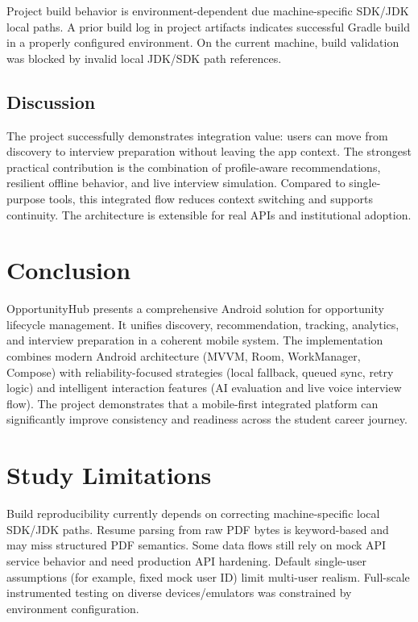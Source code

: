 \documentclass[conference]{IEEEtran}
\begin{document}
Project build behavior is environment-dependent due machine-specific SDK/JDK local paths. A prior build log in project artifacts indicates successful Gradle build in a properly configured environment. On the current machine, build validation was blocked by invalid local JDK/SDK path references.

\subsection{Discussion}

The project successfully demonstrates integration value: users can move from discovery to interview preparation without leaving the app context. The strongest practical contribution is the combination of profile-aware recommendations, resilient offline behavior, and live interview simulation. Compared to single-purpose tools, this integrated flow reduces context switching and supports continuity. The architecture is extensible for real APIs and institutional adoption.

\section{Conclusion}

OpportunityHub presents a comprehensive Android solution for opportunity lifecycle management. It unifies discovery, recommendation, tracking, analytics, and interview preparation in a coherent mobile system. The implementation combines modern Android architecture (MVVM, Room, WorkManager, Compose) with reliability-focused strategies (local fallback, queued sync, retry logic) and intelligent interaction features (AI evaluation and live voice interview flow). The project demonstrates that a mobile-first integrated platform can significantly improve consistency and readiness across the student career journey.

\section{Study Limitations}

Build reproducibility currently depends on correcting machine-specific local SDK/JDK paths. Resume parsing from raw PDF bytes is keyword-based and may miss structured PDF semantics. Some data flows still rely on mock API service behavior and need production API hardening. Default single-user assumptions (for example, fixed mock user ID) limit multi-user realism. Full-scale instrumented testing on diverse devices/emulators was constrained by environment configuration.
\end{document}
